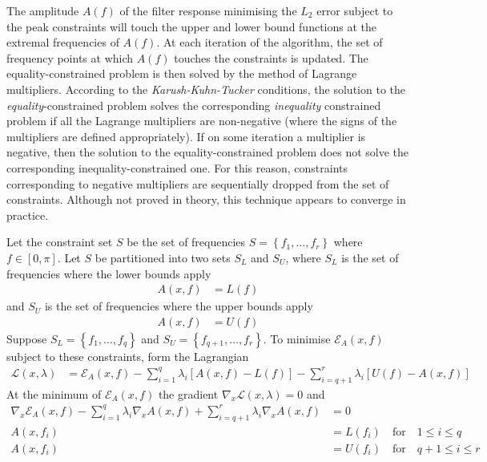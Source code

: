 \documentclass[a4paper,twoside,10pt,english]{report}
\begin{document}
The amplitude $A\left(f\right)$ of the filter response minimising the $L_{2}$
error subject to the peak constraints will touch the upper and lower bound
functions at the extremal frequencies of $A\left(f\right)$. At each iteration
of the algorithm, the set of frequency points at which $A\left(f\right)$
touches the constraints is updated. The equality-constrained problem
is then solved by the method of Lagrange multipliers. According to
the \emph{Karush-Kuhn-Tucker} conditions, the solution to the 
\emph{equality}-constrained
problem solves the corresponding \emph{inequality} constrained problem
if all the Lagrange multipliers are non-negative (where the signs
of the multipliers are defined appropriately). If on some iteration
a multiplier is negative, then the solution to the equality-constrained
problem does not solve the corresponding inequality-constrained one.
For this reason, constraints corresponding to negative multipliers
are sequentially dropped from the set of constraints. Although not
proved in theory, this technique appears to converge in practice.

Let the constraint set $S$ be the set of frequencies
$S=\left\{ f_{1},\ldots,f_{r}\right\} $
where $f\in\left[0,\pi\right]$. Let $S$ be partitioned into two
sets $S_{L}$ and $S_{U}$, where $S_{L}$ is the set of frequencies
where the lower bounds apply
\begin{align*}
A\left(x,f\right) &= L\left(f\right)
\end{align*}
and $S_{U}$ is the set of frequencies where the upper bounds apply
\begin{align*}
A\left(x,f\right) &= U\left(f\right)
\end{align*}
Suppose $S_{L}=\left\{ f_{1},\ldots,f_{q}\right\} $ and $S_{U}=\left\{ f_{q+1},\ldots,f_{r}\right\}$.
To minimise $\mathcal{E}_{A}\left(x,f\right)$ subject to these constraints,
form the Lagrangian
\begin{align*}
\mathcal{L}\left(x,\lambda\right) &= \mathcal{E}_{A}\left(x,f\right)-\sum_{i=1}^{q}\lambda_{i}\left[A\left(x,f\right)-L\left(f\right)\right]-\sum_{i=q+1}^{r}\lambda_{i}\left[U\left(f\right)-A\left(x,f\right)\right]
\end{align*}
At the minimum of $\mathcal{E}_{A}\left(x,f\right)$ the gradient
$\nabla_{x}\mathcal{L}\left(x,\lambda\right)=0$ and
\begin{align*}
\nabla_{x}\mathcal{E}_{A}\left(x,f\right)-\sum_{i=1}^{q}\lambda_{i}\nabla_{x}A\left(x,f\right)+\sum_{i=q+1}^{r}\lambda_{i}\nabla_{x}A\left(x,f\right) &= 0\\
A\left(x,f_{i}\right) &= L\left(f_{i}\right)\quad \text{for} \quad 1\le i\le q\\
A\left(x,f_{i}\right) &= U\left(f_{i}\right)\quad \text{for} \quad q+1\le i\le r
\end{align*}
\end{document}
